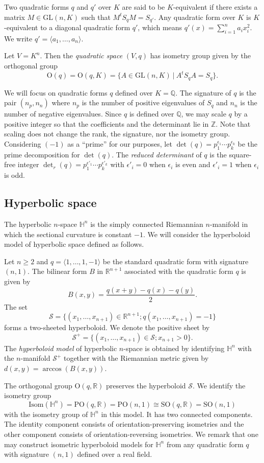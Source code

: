 \documentclass[12pt]{amsart}
\newcommand{\Or}{\mathrm{O}}
\newcommand{\SO}{\mathrm{SO}}
\renewcommand{\H}{\mathbb{H}}
\newcommand{\Q}{\mathbb{Q}}
\newcommand{\Z}{\mathbb{Z}}
\newcommand{\R}{\mathbb{R}}
\newcommand{\GL}{\mathrm{GL}}
\theoremstyle{plain}
\begin{document}
Two quadratic forms $q$ and $q'$ over $K$ are said to be $K$-equivalent if there exists a matrix $M\in\GL(n,K)$ such that $M^t S_q M= S_{q'}$. Any quadratic form over $K$ is $K$-equivalent to a diagonal quadratic form $q'$, which means $q'(x)=\sum_{i=1}^n a_ix_i^2$. We write $q'=\langle a_1,\dots,a_n \rangle$.

Let $V=K^n$. Then the \emph{quadratic space} $(V,q)$ has isometry group given by the orthogonal group 
\[ \Or(q)=\Or(q,K)=\{ A \in \GL(n,K) \:|\: A^tS_qA=S_q \}. \]

We will focus on quadratic forms $q$ defined over $K=\Q$.
The signature of $q$ is the pair $(n_p, n_n)$ where $n_p$ is the number of positive eigenvalues of $S_q$ and $n_n$ is the number of negative eigenvalues. 
Since $q$ is defined over $\Q$, we may scale $q$ by a positive integer so that the coefficients and the determinant lie in $\Z$. Note that scaling does not change the rank, the signature, nor the isometry group.
Considering $(-1)$ as a ``prime'' for our purposes, let  $\det(q)=p_1^{\epsilon_1}\cdots p_k^{\epsilon_k}$ be the prime decomposition for $\det(q)$. The \emph{reduced determinant} of $q$ is the square-free integer $\det_r(q)=p_1^{\epsilon'_1}\cdots p_k^{\epsilon'_k}$ with $\epsilon'_i=0$ when $\epsilon_i$ is even and $\epsilon'_i=1$ when $\epsilon_i$ is odd. 


\subsection{Hyperbolic space} \label{ss:hyperbolic space}
The hyperbolic $n$-space $\H^n$ is the simply connected Riemannian $n$-manifold in which the sectional curvature is constant $-1$. We will consider the hyperboloid model of hyperbolic space defined as follows.


Let $n \geq 2$ and $q=\langle 1,\dots , 1,-1\rangle$ be the standard quadratic form with signature $(n,1)$. The bilinear form $B$ in $\R^{n+1}$ associated with the quadratic form $q$ is given by
\[ {\displaystyle B(x,y) = \frac{q(x+y)-q(x)-q(y)}{2}}. \]
The set 
\[ \mathcal{S}=\{(x_1,\ldots,x_{n+1}) \in \R^{n+1}; q(x_1,\ldots,x_{n+1})=-1 \}\]
forms a two-sheeted hyperboloid. We denote the positive sheet by 
\[ \mathcal{S}^+=\{(x_1,\ldots,x_{n+1}) \in \mathcal{S}; x_{n+1}>0 \}.\] 
The \textit{hyperboloid model} of hyperbolic $n$-space is obtained by identifying $\H^n$ with the $n$-manifold $\mathcal{S}^+$ together with the Riemannian metric given by $d(x,y)=\arccos\left(B(x,y)\right)$. 

The orthogonal group $\Or(q,\R)$ preserves the hyperboloid $\mathcal{S}$. We identify the isometry group 
\[ \mathrm{Isom}(\H^n)=\mathrm{PO}(q,\R)=\mathrm{PO}(n,1)\cong\SO(q,\R)=\SO(n,1)\]
with the isometry group of $\H^n$ in this model. It has two connected components. The identity component consists of orientation-preserving isometries and the other component consists of orientation-reversing isometries. 
We remark that one may construct isometric hyperboloid models for $\H^n$ from any quadratic form $q$ with signature $(n,1)$ defined over a real field.
\end{document}
